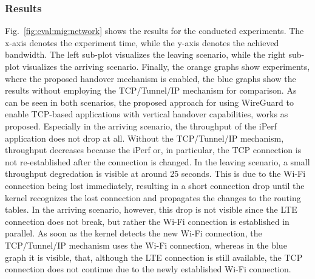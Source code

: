 \subsubsection{Results}
Fig.~\ref{fig:eval:mig:network} shows the results for the conducted experiments.
The x-axis denotes the experiment time, while the y-axis denotes the achieved bandwidth.
The left sub-plot visualizes the leaving scenario, while the right sub-plot visualizes the arriving scenario.
Finally, the orange graphs show experiments, where the proposed handover mechanism is enabled, the blue graphs show the results without employing the TCP/Tunnel/IP mechanism for comparison.
As can be seen in both scenarios, the proposed approach for using WireGuard to enable TCP-based applications with vertical handover capabilities, works  as proposed.
Especially in the arriving scenario, the throughput of the iPerf application does not drop at all.
Without the TCP/Tunnel/IP mechanism, throughput decreases because the iPerf or, in particular, the TCP connection is not re-established after the connection is changed.
In the leaving scenario, a small throughput degredation is visible at around 25 seconds.
This is due to the Wi-Fi connection being lost immediately, resulting in a short connection drop until the kernel recognizes the lost connection and propagates the changes to the routing tables.
In the arriving scenario, however, this drop is not visible since the LTE connection does not break, but rather the Wi-Fi connection is established in parallel.
As soon as the kernel detects the new Wi-Fi connection, the TCP/Tunnel/IP mechanism uses the Wi-Fi connection, whereas in the blue graph it is visible, that, although the LTE connection is still available, the TCP connection does not continue due to the newly established Wi-Fi connection.

